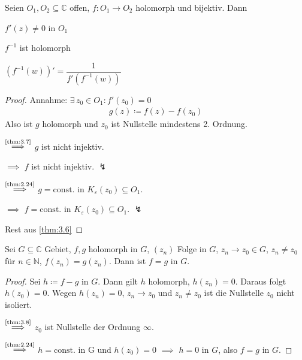 \begin{theorem} \label{thm:3.9}
  Seien $O_1, O_2 \subseteq \mathbb{C}$ offen, $f : O_1 \to O_2$ holomorph und bijektiv. Dann
  \begin{item-triangle}
    \item $f'(z) \neq 0$ in $O_1$
    
    \item $f^{-1}$ ist holomorph
    
    \item $\left(f^{-1}(w)\right)' = \dfrac{1}{f'(f^{-1}(w))}$ 
  \end{item-triangle}
  
  \begin{proof}
    Annahme: $\exists \, z_0 \in O_1 : f'(z_0) = 0$
    \begin{align*}
      g(z) \coloneq f(z) - f(z_0)
    \end{align*}
    Also ist $g$ holomorph und $z_0$ ist Nullstelle mindestens 2. Ordnung.
    
    
    $\overset{\text{\ref{thm:3.7}}}{\implies}$ $g$ ist nicht injektiv.
    
    $\implies$ $f$ ist nicht injektiv. $\lightning$
    
    
    $\overset{\text{\ref{thm:2.24}}}{\implies}$ $g = \mathrm{const.}$ in $K_\varepsilon(z_0) \subseteq O_1$.
    
    $\implies$ $f = \mathrm{const.}$ in $K_\varepsilon(z_0) \subseteq O_1$. $\lightning$
    
    Rest aus \ref{thm:3.6}
  \end{proof}
\end{theorem}

\begin{theorem}[Identitätssatz] \label{thm:3.10}
  Sei $G \subseteq \mathbb{C}$ Gebiet, $f,g$ holomorph in $G$, $(z_n)$ Folge in $G$, $z_n \to z_0 \in G$, $z_n \neq z_0$ für $n \in \mathbb{N}$, $f(z_n) = g(z_n)$. Dann ist $f=g$ in $G$.
  
  \begin{proof}
    Sei $h \coloneq f - g$ in $G$. Dann gilt $h$ holomorph, $h(z_n) = 0$. Daraus folgt $h(z_0) = 0$. Wegen $h(z_n) = 0$, $z_n \to z_0$ und $z_n \neq z_0$ ist die Nullstelle $z_0$ nicht isoliert.
    
    $\overset{\text{\ref{thm:3.8}}}{\implies}$ $z_0$ ist Nullstelle der Ordnung $\infty$.
    
    $\overset{\text{\ref{thm:2.24}}}{\implies}$ $h = \mathrm{const.}$ in G und $h(z_0) = 0$ $\implies$ $h=0$ in $G$, also $f=g$ in $G$.
  \end{proof}
\end{theorem}

